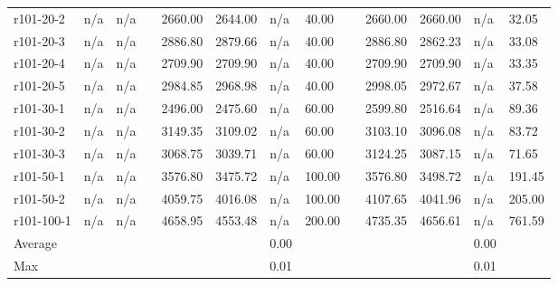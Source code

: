 \documentclass[final,5p,times,twocolumn]{elsarticle}
\begin{document}
{{{{{{{{{{{{{\begin{table*}[htbp]
\begin{tabularx}{\linewidth}{m{4.5em} l l l l l l l l l l l l}
r101-20-2&n/a&n/a&&2660.00&2644.00&n/a&40.00&&2660.00&2660.00&n/a&32.05\\
r101-20-3&n/a&n/a&&2886.80&2879.66&n/a&40.00&&2886.80&2862.23&n/a&33.08\\
r101-20-4&n/a&n/a&&2709.90&2709.90&n/a&40.00&&2709.90&2709.90&n/a&33.35\\
r101-20-5&n/a&n/a&&2984.85&2968.98&n/a&40.00&&2998.05&2972.67&n/a&37.58\\
r101-30-1&n/a&n/a&&2496.00&2475.60&n/a&60.00&&2599.80&2516.64&n/a&89.36\\
r101-30-2&n/a&n/a&&3149.35&3109.02&n/a&60.00&&3103.10&3096.08&n/a&83.72\\
r101-30-3&n/a&n/a&&3068.75&3039.71&n/a&60.00&&3124.25&3087.15&n/a&71.65\\
r101-50-1&n/a&n/a&&3576.80&3475.72&n/a&100.00&&3576.80&3498.72&n/a&191.45\\
r101-50-2&n/a&n/a&&4059.75&4016.08&n/a&100.00&&4107.65&4041.96&n/a&205.00\\
r101-100-1&n/a&n/a&&4658.95&4553.48&n/a&200.00&&4735.35&4656.61&n/a&761.59\\
\hline
Average &&&&&&0.00&&&&&0.00\\
Max &&&&&&0.01&&&&&0.01\\
\hline
\end{tabularx}
\label{tab:bm_2}
\end{table*}

}}}}}}}}}}}}}
\end{document}
